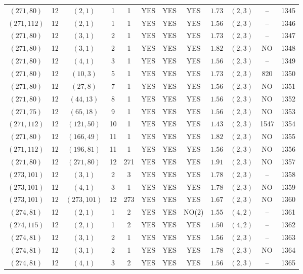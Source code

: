 \begin{longtable}{|c|c|c|c|c|c|c|c|c|c|c|c|}
$(271,80)$ & 12 & $(2,1)$ & 1 & 1 & YES & YES & YES & $1.73$ & $(2,3)$ & -- & 1345\\
$(271,112)$ & 12 & $(2,1)$ & 1 & 1 & YES & YES & YES & $1.56$ & $(2,3)$ & -- & 1346\\
$(271,80)$ & 12 & $(3,1)$ & 2 & 1 & YES & YES & YES & $1.73$ & $(2,3)$ & -- & 1347\\
$(271,80)$ & 12 & $(3,1)$ & 2 & 1 & YES & YES & YES & $1.82$ & $(2,3)$ & NO & 1348\\
$(271,80)$ & 12 & $(4,1)$ & 3 & 1 & YES & YES & YES & $1.56$ & $(2,3)$ & -- & 1349\\
$(271,80)$ & 12 & $(10,3)$ & 5 & 1 & YES & YES & YES & $1.73$ & $(2,3)$ & 820 & 1350\\
$(271,80)$ & 12 & $(27,8)$ & 7 & 1 & YES & YES & YES & $1.56$ & $(2,3)$ & NO & 1351\\
$(271,80)$ & 12 & $(44,13)$ & 8 & 1 & YES & YES & YES & $1.56$ & $(2,3)$ & NO & 1352\\
$(271,75)$ & 12 & $(65,18)$ & 9 & 1 & YES & YES & YES & $1.56$ & $(2,3)$ & NO & 1353\\
$(271,112)$ & 12 & $(121,50)$ & 10 & 1 & YES & YES & YES & $1.43$ & $(2,3)$ & 1547 & 1354\\
$(271,80)$ & 12 & $(166,49)$ & 11 & 1 & YES & YES & YES & $1.82$ & $(2,3)$ & NO & 1355\\
$(271,112)$ & 12 & $(196,81)$ & 11 & 1 & YES & YES & YES & $1.56$ & $(2,3)$ & NO & 1356\\
$(271,80)$ & 12 & $(271,80)$ & 12 & 271 & YES & YES & YES & $1.91$ & $(2,3)$ & NO & 1357\\
$(273,101)$ & 12 & $(3,1)$ & 2 & 3 & YES & YES & YES & $1.78$ & $(2,3)$ & -- & 1358\\
$(273,101)$ & 12 & $(4,1)$ & 3 & 1 & YES & YES & YES & $1.78$ & $(2,3)$ & NO & 1359\\
$(273,101)$ & 12 & $(273,101)$ & 12 & 273 & YES & YES & YES & $1.67$ & $(2,3)$ & NO & 1360\\
$(274,81)$ & 12 & $(2,1)$ & 1 & 2 & YES & YES & NO(2) & $1.55$ & $(4,2)$ & -- & 1361\\
$(274,115)$ & 12 & $(2,1)$ & 1 & 2 & YES & YES & YES & $1.50$ & $(4,2)$ & -- & 1362\\
$(274,81)$ & 12 & $(3,1)$ & 2 & 1 & YES & YES & YES & $1.56$ & $(2,3)$ & -- & 1363\\
$(274,81)$ & 12 & $(3,1)$ & 2 & 1 & YES & YES & YES & $1.78$ & $(2,3)$ & NO & 1364\\
$(274,81)$ & 12 & $(4,1)$ & 3 & 2 & YES & YES & YES & $1.56$ & $(2,3)$ & -- & 1365\\

\end{longtable}
